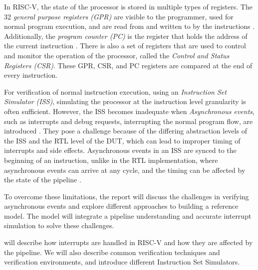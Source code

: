 In RISC-V, the state of the processor is stored in multiple types of registers. The 32 \textit{general purpose registers (GPR)} are visible to the programmer, used for normal program execution, and are read from and written to by the instructions \cite{waterman_risc-v_2019}. Additionally, the \textit{program counter (PC)} is the register that holds the address of the current instruction \cite{waterman_risc-v_2019}. There is also a set of registers that are used to control and monitor the operation of the processor, called the \textit{Control and Status Registers (CSR)}. These GPR, CSR, and PC registers are compared at the end of every instruction.




For verification of normal instruction execution, using an \textit{Instruction Set Simulator (ISS)}, simulating the processor at the instruction level granularity is often sufficient. However, the ISS becomes inadequate when \textit{Asynchronous events}, such as interrupts and debug requests, interrupting the normal program flow, are introduced \cite{taylor_advanced_2023}. They pose a challenge because of the differing abstraction levels of the ISS and the RTL level of the DUT, which can lead to improper timing of interrupts and side effects. Asynchronous events in an ISS are synced to the beginning of an instruction, unlike in the RTL implementation, where asynchronous events can arrive at any cycle, and the timing can be affected by the state of the pipeline \cite{taylor_advanced_2023}.



To overcome these limitations, the report will discuss the challenges in verifying asynchronous events and explore different approaches to building a reference model. The model will integrate a pipeline understanding and accurate interrupt simulation to solve these challenges.

 will describe how interrupts are handled in RISC-V and how they are affected by the pipeline. We will also describe common verification techniques and verification environments, and introduce different Instruction Set Simulators.

